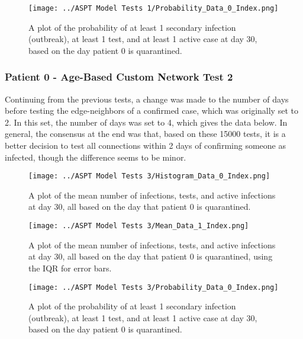 \documentclass{article}
\numberwithin{equation}{section} %
\begin{document}
\begin{figure}[H]
  \centering
  \texttt{[image: ../ASPT Model Tests 1/Probability\_Data\_0\_Index.png]}
  \caption{A plot of the probability of at least 1 secondary infection (outbreak), at least 1 test, and at least 1 active case at day 30, based on the day patient 0 is quarantined.}
\end{figure}

\subsubsection{Patient 0 - Age-Based Custom Network Test 2}
Continuing from the previous tests, a change was made to the number of days before testing the edge-neighbors of a confirmed case, which was originally set to 2. In this set, the number of days was set to 4, which gives the data below. In general, the consensus at the end was that, based on these 15000 tests, it is a better decision to test all connections within 2 days of confirming someone as infected, though the difference seems to be minor.
\begin{figure}[H]
  \centering
  \texttt{[image: ../ASPT Model Tests 3/Histogram\_Data\_0\_Index.png]}
  \caption{A plot of the mean number of infections, tests, and active infections at day 30, all based on the day that patient 0 is quarantined.}
\end{figure}

\begin{figure}[H]
  \centering
  \texttt{[image: ../ASPT Model Tests 3/Mean\_Data\_1\_Index.png]}
  \caption{A plot of the mean number of infections, tests, and active infections at day 30, all based on the day that patient 0 is quarantined, using the IQR for error bars.}
\end{figure}

\begin{figure}[H]
  \centering
  \texttt{[image: ../ASPT Model Tests 3/Probability\_Data\_0\_Index.png]}
  \caption{A plot of the probability of at least 1 secondary infection (outbreak), at least 1 test, and at least 1 active case at day 30, based on the day patient 0 is quarantined.}
\end{figure}
\end{document}
